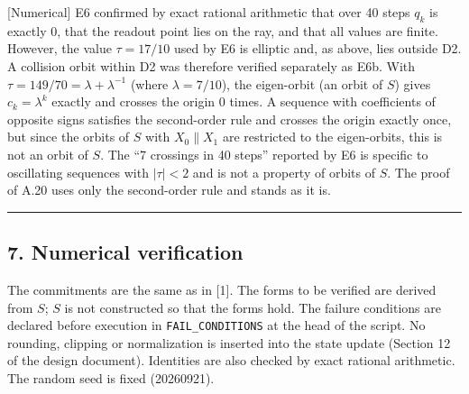\documentclass[
  a4paper,
]{article}
\begin{document}
{[}Numerical{]} E6 confirmed by exact rational arithmetic that over 40
steps \(q_k\) is exactly 0, that the readout point lies on the ray, and
that all values are finite. However, the value \(\tau=17/10\) used by E6
is elliptic and, as above, lies outside D2. A collision orbit within D2
was therefore verified separately as E6b. With
\(\tau=149/70=\lambda+\lambda^{-1}\) (where \(\lambda=7/10\)), the
eigen-orbit (an orbit of \(S\)) gives \(c_k=\lambda^k\) exactly and
crosses the origin 0 times. A sequence with coefficients of opposite
signs satisfies the second-order rule and crosses the origin exactly
once, but since the orbits of \(S\) with \(X_0\parallel X_1\) are
restricted to the eigen-orbits, this is not an orbit of \(S\). The ``7
crossings in 40 steps'' reported by E6 is specific to oscillating
sequences with \(\lvert\tau\rvert<2\) and is not a property of orbits of
\(S\). The proof of A.20 uses only the second-order rule and stands as
it is.

\begin{center}\rule{0.5\linewidth}{0.5pt}\end{center}

\subsection{7. Numerical verification}\label{numerical-verification}

The commitments are the same as in {[}1{]}. The forms to be verified are
derived from \(S\); \(S\) is not constructed so that the forms hold. The
failure conditions are declared before execution in
\texttt{FAIL\_CONDITIONS} at the head of the script. No rounding,
clipping or normalization is inserted into the state update (Section 12
of the design document). Identities are also checked by exact rational
arithmetic. The random seed is fixed (20260921).
\end{document}
